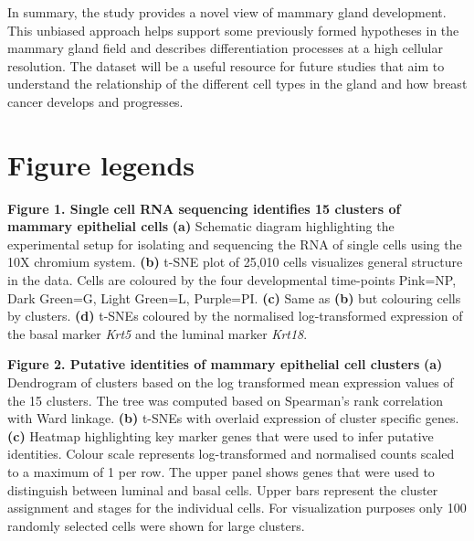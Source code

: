 \documentclass[titlepage, 12pt, oneside]{amsart}
\newcommand{\fakefigure}[1]%
{\refstepcounter{figure}\label{#1}}
\begin{document}
In summary, the study provides a novel view of mammary gland development.
This unbiased approach helps support some previously formed hypotheses in the mammary gland field and describes differentiation processes at a high cellular resolution.
The dataset will be a useful resource for future studies that aim to understand the relationship of the different cell types in the gland and how breast cancer develops and progresses.

\section{Figure legends}

\textbf{Figure 1. Single cell RNA sequencing identifies 15 clusters of mammary epithelial cells}
\fakefigure{F1}
\textbf{(a)} Schematic diagram highlighting the experimental setup for isolating and sequencing the RNA of single cells using the 10X chromium system.
\textbf{(b)} t-SNE plot of 25,010 cells visualizes general structure in the data.
Cells are coloured by the four developmental time-points Pink=NP, Dark Green=G, Light Green=L, Purple=PI.
\textbf{(c)} Same as \textbf{(b)} but colouring cells by clusters.
\textbf{(d)} t-SNEs coloured by the normalised log-transformed expression of the basal marker \textit{Krt5} and the luminal marker \textit{Krt18}.


\textbf{Figure 2. Putative identities of mammary epithelial cell clusters}
\fakefigure{F2}
\textbf{(a)} Dendrogram of clusters based on the log transformed mean expression values of the 15 clusters. The tree was computed based on Spearman's rank correlation with Ward linkage.
\textbf{(b)} t-SNEs with overlaid expression of cluster specific genes.
\textbf{(c)} Heatmap highlighting key marker genes that were used to infer putative identities.
Colour scale represents log-transformed and normalised counts scaled to a maximum of 1 per row.
The upper panel shows genes that were used to distinguish between luminal and basal cells.
Upper bars represent the cluster assignment and stages for the individual cells.
For visualization purposes only 100 randomly selected cells were shown for large clusters.
\end{document}

